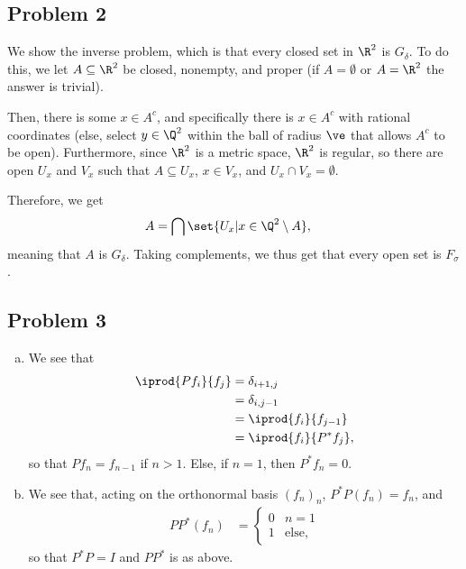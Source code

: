 \documentclass[10pt]{mypackage}
\begin{document}
\subsection{Problem 2}%
We show the inverse problem, which is that every closed set in $\R^2$ is $G_{\delta}$. To do this, we let $A\subseteq \R^2$ be closed, nonempty, and proper (if $A = \emptyset$ or $A = \R^2$ the answer is trivial).\newline

Then, there is some $x\in A^{c}$, and specifically there is $x\in A^{c}$ with rational coordinates (else, select $y\in \Q^2$ within the ball of radius $\ve$ that allows $A^{c}$ to be open). Furthermore, since $\R^2$ is a metric space, $\R^2$ is regular, so there are open $U_{x}$ and $V_x$ such that $A\subseteq U_x$, $x\in V_x$, and $U_x\cap V_x = \emptyset$.\newline

Therefore, we get
\begin{align*}
  A &= \bigcap \set{U_x | x\in \Q^2\setminus A},
\end{align*}
meaning that $A$ is $G_{\delta}$. Taking complements, we thus get that every open set is $F_{\sigma}$.
\subsection{Problem 3}%
\begin{enumerate}[(a)]
  \item We see that
    \begin{align*}
      \iprod{Pf_i}{f_j} &= \delta_{i+1,j}\\
                        &= \delta_{i,j-1}\\
                        &= \iprod{f_i}{f_{j-1}}\\
                        &= \iprod{f_i}{P^{\ast}f_j},
    \end{align*}
    so that $Pf_n = f_{n-1}$ if $n > 1$. Else, if $n = 1$, then $P^{\ast}f_n = 0$.
  \item We see that, acting on the orthonormal basis $\left( f_n \right)_n$, $P^{\ast}P\left( f_n \right) = f_n$, and
    \begin{align*}
      PP^{\ast}\left( f_n \right) &= \begin{cases}
        0 & n = 1\\
        1 & \text{else},
      \end{cases}
    \end{align*}
    so that $P^{\ast}P = I$ and $PP^{\ast}$ is as above.
\end{enumerate}
\end{document}
